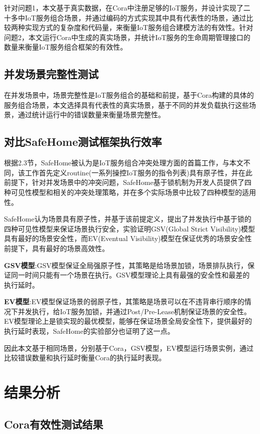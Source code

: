 \documentclass[winfonts,master,twoside]{njuthesis}
\begin{document}
针对问题1，本文基于真实数据，在Cora中注册足够的IoT服务，并设计实现了二十多中IoT服务组合场景，并通过编码的方式实现其中具有代表性的场景，通过比较两种实现方式的复杂度和代码量，来衡量IoT服务组合建模方法的有效性。针对问题2，本文运行Cora中生成的真实场景，并统计IoT服务的生命周期管理接口的数量来衡量IoT服务组合框架的有效性。

\subsection{并发场景完整性测试}
在并发场景中，场景完整性是IoT服务组合的基础和前提，基于Cora构建的具体的服务组合场景，本文选择具有代表性的真实场景，基于不同的并发负载执行这些场景，通过统计运行中的错误数量来衡量场景完整性。

\subsection{对比SafeHome测试框架执行效率}
根据2.3节，SafeHome被认为是IoT服务组合冲突处理方面的首篇工作，与本文不同，该工作首先定义routine(一系列操控IoT服务的指令列表)具有原子性，并在此前提下，针对并发场景中的冲突问题，SafeHome基于锁机制为开发人员提供了四种可见性模型和相关的冲突处理策略，并在多个实际场景中比较了四种模型的适用性。

SafeHome认为场景具有原子性，并基于该前提定义，提出了并发执行中基于锁的四种可见性模型来保证场景执行安全，实验证明GSV(Global Strict Visibility)模型具有最好的场景安全性，而EV(Eventual Visibility)模型在保证优秀的场景安全性前提下，具有最好的场景高效性。

\textbf{GSV模型}:GSV模型保证全局强原子性，其策略是给场景加锁，场景排队执行，保证同一时间只能有一个场景在执行。GSV模型理论上具有最强的安全性和最差的执行延时。

\textbf{EV模型}:EV模型保证场景的弱原子性，其策略是场景可以在不违背串行顺序的情况下并发执行，给IoT服务加锁，并通过Post/Pre-Lease机制保证场景的安全性。EV模型理论上是锁实现的最优模型，能够在保证场景全局安全性下，提供最好的执行延时表现，SafeHome的实验部分也证明了这一点。

因此本文基于相同场景，分别基于Cora，GSV模型，EV模型运行场景实例，通过比较错误数量和执行延时衡量Cora的执行延时表现。

\section{结果分析}
\subsection{Cora有效性测试结果}
\end{document}
